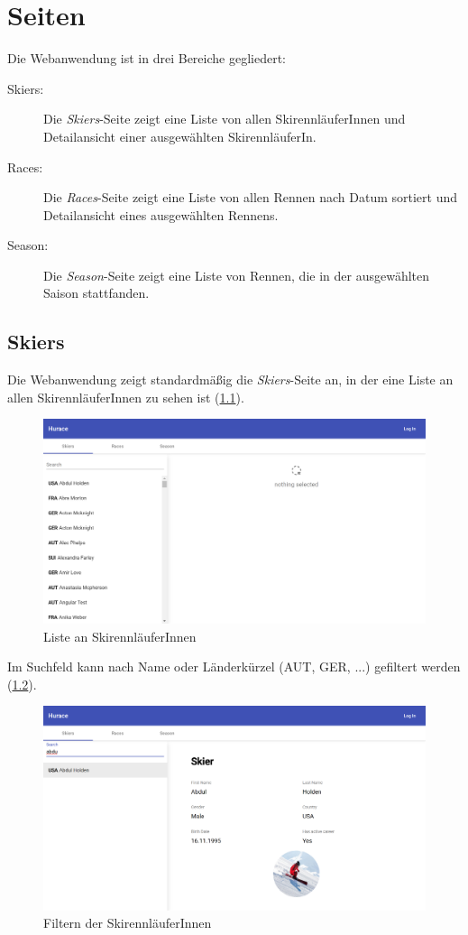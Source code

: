 \chapter{Seiten}
Die Webanwendung ist in drei Bereiche gegliedert:
\begin{description}
    \item[Skiers:] Die \emph{Skiers}-Seite zeigt eine Liste von allen SkirennläuferInnen und Detailansicht einer ausgewählten SkirennläuferIn.
    \item[Races:] Die \emph{Races}-Seite zeigt eine Liste von allen Rennen nach Datum sortiert und Detailansicht eines ausgewählten Rennens.
    \item[Season:] Die \emph{Season}-Seite zeigt eine Liste von Rennen, die in der ausgewählten Saison stattfanden.
\end{description}

\section{Skiers}
Die Webanwendung zeigt standardmäßig die \emph{Skiers}-Seite an, in der eine Liste an allen SkirennläuferInnen zu sehen ist (\cref{fig:skiers-list}).
\begin{figure}[H]
    \centering
    \includegraphics[width=0.9\linewidth]{images/skiers-list}
    \caption{Liste an SkirennläuferInnen}
\label{fig:skiers-list}
\end{figure}

Im Suchfeld kann nach Name oder Länderkürzel (\zB AUT, GER, ...) gefiltert werden (\cref{fig:skiers-search-success}).
\begin{figure}[H]
    \centering
    \includegraphics[width=0.9\linewidth]{images/skiers-search-success}
    \caption{Filtern der SkirennläuferInnen}
\label{fig:skiers-search-success}
\end{figure}

